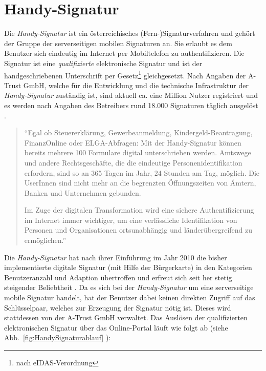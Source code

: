 \documentclass[11pt,a4paper,ngerman]{scrreprt}
\begin{document}
\section{Handy-Signatur}\label{sec:HandySignatur}
Die \textit{Handy-Signatur} ist ein österreichisches (Fern-)Signaturverfahren und gehört der Gruppe der serverseitigen mobilen Signaturen an. Sie erlaubt es dem Benutzer sich eindeutig im Internet per Mobiltelefon zu authentifizieren. Die Signatur ist eine \emph{qualifizierte} elektronische Signatur und ist der handgeschriebenen Unterschrift per Gesetz\footnote{nach eIDAS-Verordnung} gleichgesetzt. Nach Angaben der A-Trust GmbH, welche für die Entwicklung und die technische Infrastruktur der \textit{Handy-Signatur} zuständig ist, sind aktuell ca. eine Million Nutzer registriert und es werden nach Angaben des Betreibers rund 18.000 Signaturen täglich ausgelöst \cite{atrustHSig}.
\begin{quote}
    ``Egal ob Steuererklärung, Gewerbeanmeldung, Kindergeld-Beantragung, FinanzOnline oder ELGA-Abfragen: Mit der Handy-Signatur können bereits mehrere 100 Formulare digital unterschrieben werden. Amtswege und andere Rechtsgeschäfte, die die eindeutige Personenidentifikation erfordern, sind so an 365 Tagen im Jahr, 24 Stunden am Tag, möglich. Die UserInnen sind nicht mehr an die begrenzten Öffnungszeiten von Ämtern, Banken und Unternehmen gebunden.

    Im Zuge der digitalen Transformation wird eine sichere Authentifizierung im Internet immer wichtiger, um eine verlässliche Identifikation von Personen und Organisationen ortsunabhängig und länderübergreifend zu ermöglichen.'' \cite{atrustHSig}
\end{quote}
Die \textit{Handy-Signatur} hat nach ihrer Einführung im Jahr 2010 die bisher implementierte digitale Signatur (mit Hilfe der Bürgerkarte) in den Kategorien Benutzeranzahl und Adaption übertroffen und erfreut sich seit her stetig steigender Beliebtheit \cite[S.\,219, Abb.\,1]{scWorkshop}. Da es sich bei der \textit{Handy-Signatur} um eine serverseitige mobile Signatur handelt, hat der Benutzer dabei keinen direkten Zugriff auf das Schlüsselpaar, welches zur Erzeugung der Signatur nötig ist. Dieses wird stattdessen von der A-Trust GmbH verwaltet. Das Auslösen der qualifizierten elektronischen Signatur über das Online-Portal läuft wie folgt ab (siehe Abb.~\ref{fig:HandySignaturablauf} \cite[S.~3]{mobQes}):
\end{document}
